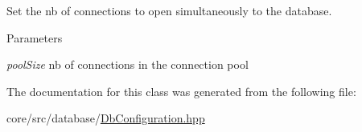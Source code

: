 Set the nb of connections to open simultaneously to the database. 


\begin{DoxyParams}{Parameters}
\item[{\em poolSize}]nb of connections in the connection pool \end{DoxyParams}


The documentation for this class was generated from the following file:\begin{DoxyCompactItemize}
\item 
core/src/database/\hyperlink{DbConfiguration_8hpp}{DbConfiguration.hpp}\end{DoxyCompactItemize}
